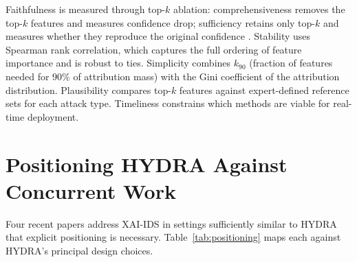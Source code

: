 \documentclass[12pt,a4paper]{report}
\begin{document}
Faithfulness is measured through top-$k$ ablation: comprehensiveness removes the top-$k$ features and measures confidence drop; sufficiency retains only top-$k$ and measures whether they reproduce the original confidence \cite{bhatt2020,deyoung2020}. Stability uses Spearman rank correlation, which captures the full ordering of feature importance and is robust to ties. Simplicity combines $k_{90}$ (fraction of features needed for 90\% of attribution mass) with the Gini coefficient of the attribution distribution. Plausibility compares top-$k$ features against expert-defined reference sets for each attack type. Timeliness constrains which methods are viable for real-time deployment.

\section{Positioning HYDRA Against Concurrent Work}
\label{sec:positioning}

Four recent papers address XAI-IDS in settings sufficiently similar to HYDRA that explicit positioning is necessary. Table~\ref{tab:positioning} maps each against HYDRA's principal design choices.
\end{document}
